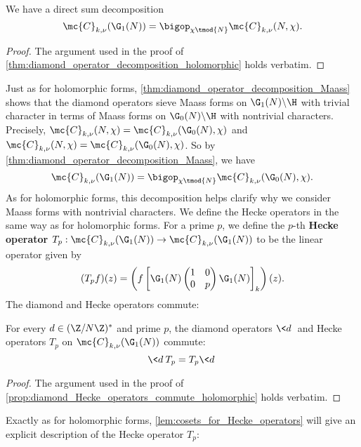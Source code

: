    \begin{proposition}\label{thm:diamond_operator_decomposition_Maass}
      We have a direct sum decomposition
      \[
        \mc{C}_{k,\nu}(\G_{1}(N)) = \bigop_{\chi \tmod{N}}\mc{C}_{k,\nu}(N,\chi).
      \]
    \end{proposition}
    \begin{proof}
      The argument used in the proof of \cref{thm:diamond_operator_decomposition_holomorphic} holds verbatim.
    \end{proof}

    Just as for holomorphic forms, \cref{thm:diamond_operator_decomposition_Maass} shows that the diamond operators sieve Maass forms on $\G_{1}(N)\backslash\H$ with trivial character in terms of Maass forms on $\G_{0}(N)\backslash\H$ with nontrivial characters. Precisely, $\mc{C}_{k,\nu}(N,\chi) = \mc{C}_{k,\nu}(\G_{0}(N),\chi)$ and $\mc{C}_{k,\nu}(N,\chi) = \mc{C}_{k,\nu}(\G_{0}(N),\chi)$. So by \cref{thm:diamond_operator_decomposition_Maass}, we have
    \[
      \mc{C}_{k,\nu}(\G_{1}(N)) = \bigop_{\chi \tmod{N}}\mc{C}_{k,\nu}(\G_{0}(N),\chi).
    \]
    As for holomorphic forms, this decomposition helps clarify why we consider Maass forms with nontrivial characters. We define the Hecke operators in the same way as for holomorphic forms. For a prime $p$, we define the $p$-th \textbf{Hecke operator} $T_{p}:\mc{C}_{k,\nu}(\G_{1}(N)) \to \mc{C}_{k,\nu}(\G_{1}(N))$ to be the linear operator given by
    \[
      (T_{p}f)(z) = \left(f\left[\G_{1}(N)\begin{pmatrix} 1 & 0 \\ 0 & p \end{pmatrix}\G_{1}(N)\right]_{k}\right)(z).
    \]
    The diamond and Hecke operators commute:

    \begin{proposition}\label{prop:diamond_Hecke_operators_commute_Maass}
      For every $d \in (\Z/N\Z)^{\ast}$ and prime $p$, the diamond operators $\<d\>$ and Hecke operators $T_{p}$ on $\mc{C}_{k,\nu}(\G_{1}(N))$ commute:
      \[
        \<d\>T_{p} = T_{p}\<d\>
      \]
    \end{proposition}
    \begin{proof}
      The argument used in the proof of \cref{prop:diamond_Hecke_operators_commute_holomorphic} holds verbatim.
    \end{proof}

    Exactly as for holomorphic forms, \cref{lem:cosets_for_Hecke_operators} will give an explicit description of the Hecke operator $T_{p}$:

